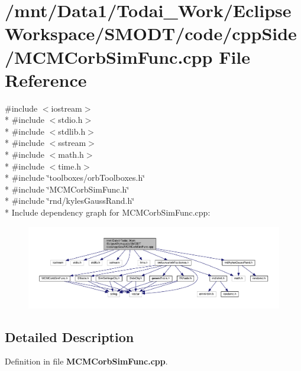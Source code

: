 \section{/mnt/\-Data1/\-Todai\-\_\-\-Work/\-Eclipse\-Workspace/\-S\-M\-O\-D\-T/code/cpp\-Side/\-M\-C\-M\-Corb\-Sim\-Func.cpp File Reference}
\label{_m_c_m_corb_sim_func_8cpp}
{\ttfamily \#include $<$iostream$>$}\\*
{\ttfamily \#include $<$stdio.\-h$>$}\\*
{\ttfamily \#include $<$stdlib.\-h$>$}\\*
{\ttfamily \#include $<$sstream$>$}\\*
{\ttfamily \#include $<$math.\-h$>$}\\*
{\ttfamily \#include $<$time.\-h$>$}\\*
{\ttfamily \#include \char`\"{}toolboxes/orb\-Toolboxes.\-h\char`\"{}}\\*
{\ttfamily \#include \char`\"{}M\-C\-M\-Corb\-Sim\-Func.\-h\char`\"{}}\\*
{\ttfamily \#include \char`\"{}rnd/kyles\-Gauss\-Rand.\-h\char`\"{}}\\*
Include dependency graph for M\-C\-M\-Corb\-Sim\-Func.\-cpp\-:
\nopagebreak
\begin{figure}[H]
\begin{center}
\leavevmode
\includegraphics[width=350pt]{_m_c_m_corb_sim_func_8cpp__incl}
\end{center}
\end{figure}


\subsection{Detailed Description}


Definition in file {\bf M\-C\-M\-Corb\-Sim\-Func.\-cpp}.


